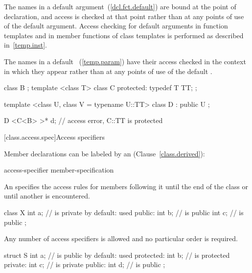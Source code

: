 \pnum
{}%
%
The names in a default argument~(\ref{dcl.fct.default}) are
bound at the point of declaration, and access is checked at that
point rather than at any points of use of the default argument.
Access checking for default arguments in function templates and in
member functions of class templates is performed as described in~\ref{temp.inst}.

\pnum
The names in a default ~(\ref{temp.param})
have their access checked in the context in which they appear rather than at any
points of use of the default . \enterexample
\begin{codeblock}
class B { };
template <class T> class C {
protected:
  typedef T TT;
};

template <class U, class V = typename U::TT>
class D : public U { };

D <C<B> >* d;       // access error, C::TT is protected
\end{codeblock}
\exitexample

[class.access.spec]{Access specifiers}%

\pnum
Member declarations can be labeled by an
(Clause~\ref{class.derived}):

\begin{ncbnftab}
access-specifier \terminal{:} member-specification\opt
\end{ncbnftab}

An
specifies the access rules for members following it
until the end of the class or until another
is encountered.
\enterexample

\begin{codeblock}
class X {
  int a;            //  is private by default:  used
public:
  int b;            //  is public
  int c;            //  is public
};
\end{codeblock}
\exitexample

\pnum
Any number of access specifiers is allowed and no particular order is required.
\enterexample

\begin{codeblock}
struct S {
  int a;            //  is public by default:  used
protected:
  int b;            //  is protected
private:
  int c;            //  is private
public:
  int d;            //  is public
};
\end{codeblock}
\exitexample

